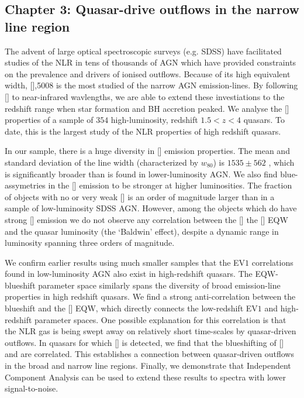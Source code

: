 \subsection{Chapter 3: Quasar-drive outflows in the narrow line region}

The advent of large optical spectroscopic surveys (e.g. SDSS) have facilitated studies of the NLR in tens of thousands of AGN which have provided constraints on the prevalence and drivers of ionised outflows.  
Because of its high equivalent width, [],5008 is the most studied of the narrow AGN emission-lines.  
By following [] to near-infrared wavlengths, we are able to extend these investiations to the redshift range when star formation and BH accretion peaked. 
We analyse the [] properties of a sample of $354$ high-luminosity, redshift $1.5 < z < 4$ quasars. 
To date, this is the largest study of the NLR properties of high redshift quasars. 

In our sample, there is a huge diversity in [] emission properties.
The mean and standard deviation of the line width (characterized by $w_{80}$) is $1535\pm562$ \kms, which is significantly broader than is found in lower-luminosity AGN. 
We also find blue-assymetries in the [] emission to be stronger at higher luminosities. 
The fraction of objects with no or very weak [] is an order of magnitude larger than in a sample of low-luminosity SDSS AGN.
However, among the objects which do have strong [] emission we do not observe any correlation between the [] the [] EQW and the quasar luminosity (the `Baldwin' effect), despite a dynamic range in luminosity spanning three orders of magnitude. 

We confirm earlier results using much smaller samples that the EV$1$ correlations found in low-luminosity AGN also exist in high-redshift quasars. 
The  EQW-blueshift parameter space similarly spans the diversity of broad emission-line properties in high redshift quasars. 
We find a strong anti-correlation between the  blueshift and the [] EQW, which directly connects the low-redshift EV$1$ and high-redshift  parameter spaces.  
One possible explanation for this correlation is that the NLR gas is being swept away on relatively short time-scales by quasar-driven outflows. 
In quasars for which [] is detected, we find that the blueshifting of [] and  are correlated. 
This establishes a connection between quasar-driven outflows in the broad and narrow line regions.  
Finally, we demonstrate that Independent Component Analysis can be used to extend these results to spectra with lower signal-to-noise. 


